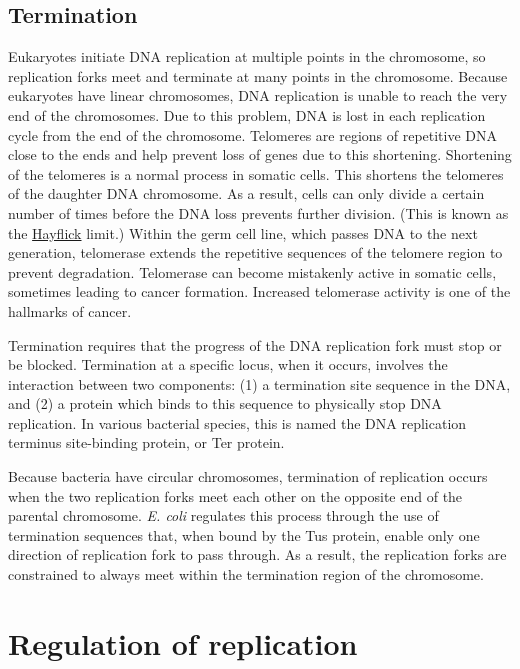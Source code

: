 \hypertarget{termination}{%
\subsection{Termination}\label{termination}}

Eukaryotes initiate DNA replication at multiple points in the chromosome, so replication forks meet and terminate at many points in the chromosome. Because eukaryotes have linear chromosomes, DNA replication is unable to reach the very end of the chromosomes. Due to this problem, DNA is lost in each replication cycle from the end of the chromosome. Telomeres are regions of repetitive DNA close to the ends and help prevent loss of genes due to this shortening. Shortening of the telomeres is a normal process in somatic cells. This shortens the telomeres of the daughter DNA chromosome. As a result, cells can only divide a certain number of times before the DNA loss prevents further division. (This is known as the \href{https://en.wikipedia.org/wiki/Leonard_Hayflick}{Hayflick} limit.) Within the germ cell line, which passes DNA to the next generation, telomerase extends the repetitive sequences of the telomere region to prevent degradation. Telomerase can become mistakenly active in somatic cells, sometimes leading to cancer formation. Increased telomerase activity is one of the hallmarks of cancer.

Termination requires that the progress of the DNA replication fork must stop or be blocked. Termination at a specific locus, when it occurs, involves the interaction between two components: (1) a termination site sequence in the DNA, and (2) a protein which binds to this sequence to physically stop DNA replication. In various bacterial species, this is named the DNA replication terminus site-binding protein, or Ter protein.

Because bacteria have circular chromosomes, termination of replication occurs when the two replication forks meet each other on the opposite end of the parental chromosome. \emph{E. coli} regulates this process through the use of termination sequences that, when bound by the Tus protein, enable only one direction of replication fork to pass through. As a result, the replication forks are constrained to always meet within the termination region of the chromosome.

\hypertarget{regulation-of-replication}{%
\section{Regulation of replication}\label{regulation-of-replication}}

